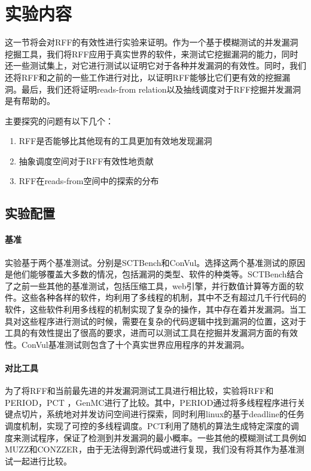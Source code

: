 \section{实验内容}

这一节将会对RFF的有效性进行实验来证明。作为一个基于模糊测试的并发漏洞挖掘工具，我们将RFF应用于真实世界的软件，来测试它挖掘漏洞的能力，同时还一些测试集上，对它进行测试以证明它对于各种并发漏洞的有效性。同时，我们还将RFF和之前的一些工作进行对比，以证明RFF能够比它们更有效的挖掘漏洞。最后，我们还将证明reads-from relation以及抽线调度对于RFF挖掘并发漏洞是有帮助的。

主要探究的问题有以下几个：

\begin{enumerate}
\item RFF是否能够比其他现有的工具更加有效地发现漏洞
\item 抽象调度空间对于RFF有效性地贡献
\item RFF在reads-from空间中的探索的分布
\end{enumerate}

\subsection{实验配置}

\paragraph{基准}实验基于两个基准测试。分别是SCTBench\cite{githubGitHubMcimperialsctbench, wen2022controlled}和ConVul\cite{cai2019detecting}。选择这两个基准测试的原因是他们能够覆盖大多数的情况，包括漏洞的类型、软件的种类等。SCTBench结合了之前一些其他的基准测试，包括压缩工具\cite{yu2009case}，web引擎\cite{jalbert2011radbench}，并行数值计算等方面的软件。这些各种各样的软件，均利用了多线程的机制，其中不乏有超过几千行代码的软件，这些软件利用多线程的机制实现了复杂的操作，其中存在着并发漏洞。当工具对这些程序进行测试的时候，需要在复杂的代码逻辑中找到漏洞的位置，这对于工具的有效性提出了很高的要求，进而可以测试工具在挖掘并发漏洞方面的有效性。ConVul基准测试则包含了十个真实世界应用程序的并发漏洞。

\paragraph{对比工具}为了将RFF和当前最先进的并发漏洞测试工具进行相比较，实验将RFF和PERIOD\cite{wen2022controlled}，PCT\cite{burckhardt2010randomized} ，GenMC\cite{kokologiannakis2019model, kokologiannakis2021genmc}进行了比较。其中，PERIOD通过将多线程程序进行关键点切片，系统地对并发访问空间进行探索，同时利用linux的基于deadline的任务调度机制，实现了可控的多线程调度。PCT利用了随机的算法生成特定深度的调度来测试程序，保证了检测到并发漏洞的最小概率。一些其他的模糊测试工具例如MUZZ\cite{chen2020muzz}和CONZZER\cite{jiang2022context}，由于无法得到源代码或进行复现，我们没有将其作为基准测试一起进行比较。

